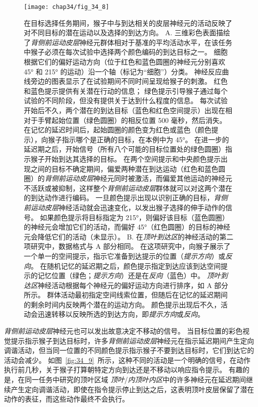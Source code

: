 \begin{figure}[htbp]
	\centering
	\texttt{[image: chap34/fig\_34\_8]}
	\caption{在目标选择任务期间，猴子中与到达相关的皮层神经元的活动反映了对不同目标的潜在运动以及选择的到达方向。
		A. 三维彩色表面描绘了\textit{背侧前运动皮层}神经元群体相对于基准的平均活动水平，在该任务中猴子必须在每次试验中选择两个颜色编码的到达目标之一。
		细胞根据它们的偏好运动方向（位于红色和蓝色圆圈的神经元分别喜欢 45° 和 215° 的运动）沿一个轴（标记为“细胞”）分类。
		神经反应曲线旁边的图表显示了在试验期间不同时间呈现给猴子的刺激。
		红色和蓝色提示提供有关潜在行动的信息；
		绿色提示引导猴子通过每个试验的不同阶段，但没有提供关于达到什么程度的信息。
		每次试验开始后不久，两个潜在的到达目标（蓝色和红色空间提示）出现在相对于手臂起始位置（绿色圆圈）的相反位置 500 毫秒，然后消失。
		在记忆的延迟时间后，起始圆圈的颜色变为红色或蓝色（颜色提示），向猴子指示哪个是正确的目标，在本例中为 45°。
		在进一步的延迟期之后，开始信号（所有八个可能的目标位置处的绿色圆圈）指示猴子开始到达其选择的目标。
		在两个空间提示和中央颜色提示出现之间的目标不确定期间，偏爱两种潜在到达运动（红色和蓝色圆圈）的\textit{背侧前运动皮层}神经元同时被激活，而偏爱其他运动的神经元不活跃或被抑制，这样整个\textit{背侧前运动皮层}群体就可以对这两个潜在的到达动作进行编码。
		一旦颜色提示出现以识别正确的目标，\textit{背侧前运动皮层}神经活动就会迅速变化，以发出猴子选择的伸手动作的信号。
		如果颜色提示将目标指定为 215°，则偏好该目标（蓝色圆圈）的神经元会增加它们的活动，而偏好 45°（红色圆圈）的目标的神经元会降低它们的活动（未显示）\cite{cisek2010neural}。
		B. 在\textit{顶叶到达区}的神经活动的第二项研究中，数据格式与 A 部分相同。
		在这项研究中，向猴子展示了一个单一的空间提示，指示它准备到达提示的位置（\textit{提示方向}）或\textit{反向}。
		在随机记忆的延迟期之后，颜色提示指定到达应该到达空间提示的记忆位置（绿色；\textit{提示方向}）还是在\textit{反向}（蓝色）中。
		\textit{顶叶到达区}神经活动根据每个神经元的偏好运动方向进行排序，如 A 部分所示。
		群体活动最初指定空间线索位置，但随后在记忆的延迟期间的剩余时间内反映两个潜在的运动方向。
		颜色提示出现后不久，活动会迅速转移以反映所选的到达方向，即\textit{提示方向}或\textit{反向}\cite{klaes2011choosing}。}
	\label{fig:34_8}
\end{figure}


\textit{背侧前运动皮层}神经元也可以发出故意决定不移动的信号。
当目标位置的彩色视觉提示指示猴子到达目标时，许多\textit{背侧前运动皮层}神经元在指示延迟期间产生定向调谐活动，但当同一位置的不同颜色提示指示猴子不要到达目标时，它们到达它的活动会减少。
如图~\ref{fig:34_9}~所示，这种不同的活动是一个明确的信号，在动作执行前几秒，关于猴子打算朝特定方向到达还是不移动以响应指令提示。
有趣的是，在同一任务中研究的顶叶区域 \textit{顶叶}/\textit{内顶叶内区}中的许多神经元在延迟期间继续产生定向调谐活动，即使在指令提示停止到达之后，这表明顶叶皮层保留了潜在动作的表征，而这些动作最终不会执行。


